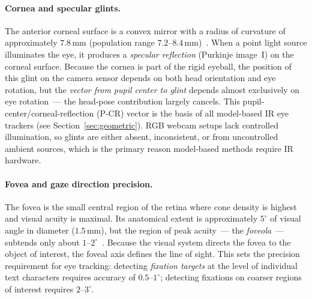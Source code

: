 \documentclass[11pt,a4paper]{article}
\begin{document}
\paragraph{Cornea and specular glints.}
The anterior corneal surface is a convex mirror with a radius of curvature of approximately $7.8\,\text{mm}$ (population range $7.2$--$8.4\,\text{mm}$)~\cite{atchison2000optics}.
When a point light source illuminates the eye, it produces a \textit{specular reflection} (Purkinje image~I) on the corneal surface.
Because the cornea is part of the rigid eyeball, the position of this glint on the camera sensor depends on both head orientation and eye rotation, but the \emph{vector from pupil center to glint} depends almost exclusively on eye rotation~--- the head-pose contribution largely cancels.
This pupil-center/corneal-reflection (P-CR) vector is the basis of all model-based IR eye trackers (see Section~\ref{sec:geometric}).
RGB webcam setups lack controlled illumination, so glints are either absent, inconsistent, or from uncontrolled ambient sources, which is the primary reason model-based methods require IR hardware.

\paragraph{Fovea and gaze direction precision.}
The fovea is the small central region of the retina where cone density is highest and visual acuity is maximal.
Its anatomical extent is approximately $5^\circ$ of visual angle in diameter ($1.5\,\text{mm}$), but the region of peak acuity~--- the \textit{foveola}~--- subtends only about $1$--$2^\circ$~\cite{curcio1990human}.
Because the visual system directs the fovea to the object of interest, the foveal axis defines the line of sight.
This sets the precision requirement for eye tracking: detecting \textit{fixation targets} at the level of individual text characters requires accuracy of $0.5$--$1^\circ$; detecting fixations on coarser regions of interest requires $2$--$3^\circ$.
\end{document}
